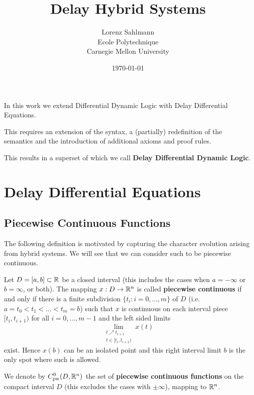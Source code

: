 \documentclass[10pt]{article}
\begin{document}
\title{Delay Hybrid Systems}

\author{Lorenz Sahlmann\\ Ecole Polytechnique\\ Carnegie Mellon University}
\date{\today}

\maketitle


In this work we extend Differential Dynamic Logic with Delay Differential Equations.

This requires an extension of the syntax, a (partially) redefinition of the semantics and the introduction of additional axioms and proof rules.

This results in a superset of \dL which we call \textbf{Delay Differential Dynamic Logic}.

\section{Delay Differential Equations}\label{delay-differential-equations}

\subsection{Piecewise Continuous Functions}\label{piecewise-continuous-functions}
The following definition is motivated by capturing the character evolution arising from hybrid systems. We will see that we can consider such to be piecewise continuous.

\begin{definition}
    \label{definition-piecewise-continuous}

    Let $D=[a,b]\subset\mathbb{R}$ be a closed interval (this includes the cases when $a=-\infty$ or $b=\infty$, or both). The mapping $x:D\rightarrow\mathbb{R}^n$ is called \textbf{piecewise continuous} if and only if there is a finite subdivision $\{t_i:i=0,\ldots,m\}$ of $D$ (i.e.\ $a=t_0<t_1<\ldots<t_m=b$) such that $x$ is continuous on each interval piece $[t_i,t_{i+1})$ for all $i=0,\ldots,m-1$ and the left sided limits
    \begin{equation}
        \lim_{\substack{t\nearrow t_{i+1}\\ t\in[t_i,t_{i+1})}} x(t)
    \end{equation}
    exist. Hence $x(b)$ can be an isolated point and this right interval limit $b$ is the only spot where such is allowed.

    We denote by $C^0_\text{pw}(D,\mathbb{R}^n)$ the set of \textbf{piecewise continuous functions} on the compact interval $D$ (this excludes the cases with $\pm\infty$), mapping to $\mathbb{R}^n$.

\end{definition}
\end{document}
